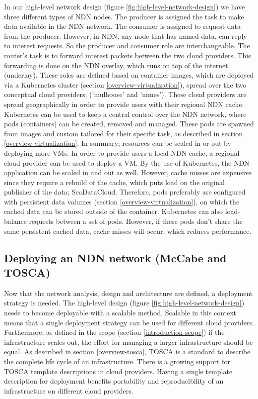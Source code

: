 In our high-level network design (figure \ref{fig:high-level-network-design}) we have three different types of NDN nodes. The producer is assigned the task to make data available in the NDN network. The consumer is assigned to request data from the producer. However, in NDN, any node that has named data, can reply to interest requests. So the producer and consumer role are interchangeable. The router's task is to forward interest packets between the two cloud providers. This forwarding is done on the NDN overlay, which runs on top of the internet (underlay). These roles are defined based on container images, which are deployed via a Kubernetes cluster (section \ref{overview-virtualization}), spread over the two conceptual cloud providers; ('mulhouse' and 'nimes'). These cloud providers are spread geographically in order to provide users with their regional NDN cache. Kubernetes can be used to keep a central control over the NDN network, where pods (containers) can be created, removed and managed. These pods are spawned from images and custom tailored for their specific task, as described in section \ref{overview-virtualization}. In summary; resources can be scaled in or out by deploying more VMs. In order to provide users a local NDN cache, a regional cloud provider can be used to deploy a VM. By the use of Kubernetes, the NDN application can be scaled in and out as well. However, cache misses are expensive since they require a rebuild of the cache, which puts load on the original publisher of the data; SeaDataCloud. Therefore, pods preferably are configured with persistent data volumes (section \ref{overview-virtualization}), on which the cached data can be stored outside of the container. Kubernetes can also load-balance requests between a set of pods. However, if these pods don't share the same persistent cached data, cache misses will occur, which reduces performance.

\subsection{Deploying an NDN network (McCabe and TOSCA)}
\label{planning-deploying}
Now that the network analysis, design and architecture are defined, a deployment strategy is needed. The high-level design (figure \ref{fig:high-level-network-design}) needs to become deployable with a scalable method. Scalable in this context means that a single deployment strategy can be used for different cloud providers. Furthermore, as defined in the scope (section \ref{introduction-scope}) if the infrastructure scales out, the effort for managing a larger infrastructure should be equal. As described in section \ref{overview-tosca}, TOSCA is a standard to describe the complete life cycle of an infrastructure. There is a growing support for TOSCA template descriptions in cloud providers. Having a single template description for deployment benefits portability and reproducibility of an infrastructure on different cloud providers.

